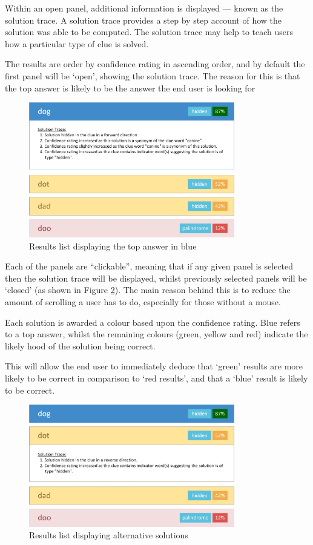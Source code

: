Within an open panel, additional information is displayed --- known as the 
solution trace. A solution trace provides a step by step account of how the 
solution was able to be computed. The solution trace may help to teach users how
a particular type of clue is solved.

The results are order by confidence rating in ascending order, and by default 
the first panel will be `open', showing the solution trace. The reason for this
is that the top answer is likely to be the answer the end user is looking for

\begin{figure}[H]
  \centering
  \includegraphics[width=0.8\textwidth]{ui/results_primary.jpg}
  \caption{Results list displaying the top answer in blue}
  \label{fig:results_primary}
\end{figure}

Each of the panels are ``clickable'', meaning that if any given panel is 
selected then the solution trace will be displayed, whilst previously selected 
panels will be `closed' (as shown in Figure \ref{fig:results_secondary}). The 
main reason behind this is to reduce the amount of scrolling a user has to do, 
especially for those without a mouse.

Each solution is awarded a colour based upon the confidence rating. Blue refers 
to a top answer, whilst the remaining colours (green, yellow and red) indicate 
the likely hood of the solution being correct. 

This will allow the end user to immediately deduce that `green' results are 
more likely to be correct in comparison to `red results', and that a `blue' 
result is likely to be correct.

\begin{figure}[H]
  \centering
  \includegraphics[width=0.8\textwidth]{ui/results_secondary.jpg}
  \caption{Results list displaying alternative solutions}
  \label{fig:results_secondary}
\end{figure}
